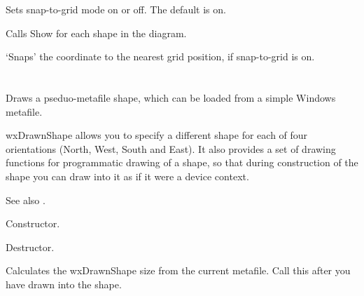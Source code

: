 

Sets snap-to-grid mode on or off. The default is on.



Calls Show for each shape in the diagram.



`Snaps' the coordinate to the nearest grid position, if snap-to-grid is on.

\section{}\label{wxdrawnshape}

Draws a pseduo-metafile shape, which can be loaded from a simple Windows metafile.

wxDrawnShape allows you to specify a different shape for each of four orientations (North, West,
South and East). It also provides a set of drawing functions for programmatic drawing of a shape,
so that during construction of the shape you can draw into it as if it were a device context.



See also .




Constructor.



Destructor.



Calculates the wxDrawnShape size from the current metafile. Call this after you have drawn
into the shape.

\label{wxdrawnshapedestroyclippingrect}

